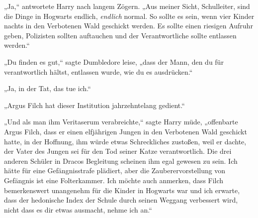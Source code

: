 „Ja,“ antwortete Harry nach langem Zögern. „Aus meiner Sicht, Schulleiter, sind die Dinge in Hogwarts endlich, \emph{endlich} normal. So sollte es sein, wenn vier Kinder nachts in den Verbotenen Wald geschickt werden. Es sollte einen riesigen Aufruhr geben, Polizisten sollten auftauchen und der Verantwortliche sollte entlassen werden.“

„Du finden es gut,“ sagte Dumbledore leise, „dass der Mann, den du für verantwortlich hältst, entlassen wurde, wie du es ausdrücken.“

„Ja, in der Tat, das tue ich.“

„Argus Filch hat dieser Institution jahrzehntelang gedient.“

„Und als man ihm Veritaserum verabreichte,“ sagte Harry müde, „offenbarte Argus Filch, dass er einen elfjährigen Jungen in den Verbotenen Wald geschickt hatte, in der Hoffnung, ihm würde etwas Schreckliches zustoßen, weil er dachte, der Vater des Jungen sei für den Tod seiner Katze verantwortlich. Die drei anderen Schüler in Dracos Begleitung scheinen ihm egal gewesen zu sein. Ich hätte für eine Gefängnisstrafe plädiert, aber die Zauberervorstellung von Gefängnis ist eine Folterkammer. Ich möchte auch anmerken, dass Filch bemerkenswert unangenehm für die Kinder in Hogwarts war und ich erwarte, dass der hedonische Index der Schule durch seinen Weggang verbessert wird, nicht dass es dir etwas ausmacht, nehme ich an.“


